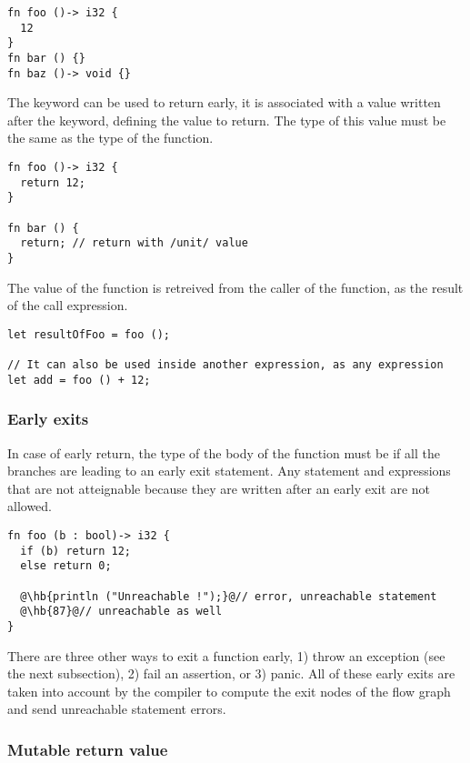 \begin{lstlisting}[style=coloredverbatim]
fn foo ()-> i32 {
  12
}
fn bar () {}
fn baz ()-> void {}
\end{lstlisting}

The keyword  can be used to return early, it is associated with a
value written after the keyword, defining the value to return. The type of this
value must be the same as the type of the function.

\begin{lstlisting}[style=coloredverbatim]
fn foo ()-> i32 {
  return 12;
}

fn bar () {
  return; // return with /unit/ value
}
\end{lstlisting}

The value of the function is retreived from the caller of the function, as the
result of the call expression.

\begin{lstlisting}[style=coloredverbatim]
let resultOfFoo = foo ();

// It can also be used inside another expression, as any expression
let add = foo () + 12;
\end{lstlisting}

\subsubsection {Early exits}
\label{sec:function_early_return}

In case of early return, the type of the body of the function must be
 if all the branches are leading to an early exit statement. Any
statement and expressions that are not atteignable because they are written
after an early exit are not allowed.

\begin{lstlisting}[style=coloredverbatim, escapechar=@]
fn foo (b : bool)-> i32 {
  if (b) return 12;
  else return 0;

  @\hb{println ("Unreachable !");}@// error, unreachable statement
  @\hb{87}@// unreachable as well
}
\end{lstlisting}

There are three other ways to exit a function early, 1) throw an exception (see
the next subsection), 2) fail an assertion, or 3) panic. All of these early
exits are taken into account by the compiler to compute the exit nodes of the
flow graph and send unreachable statement errors.

\subsubsection{Mutable return value}

